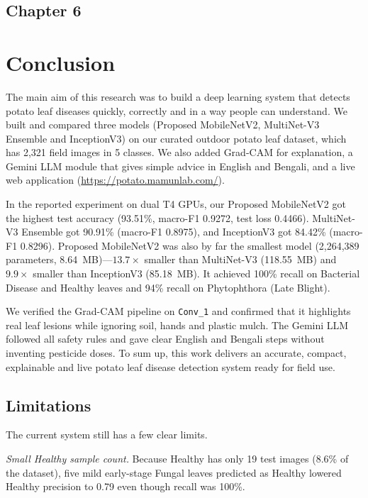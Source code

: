 \begin{center}
    \section*{\fontsize{20}{20}\selectfont Chapter 6}
\end{center}
\vspace{10mm}

\section{Conclusion}

The main aim of this research was to build a deep learning system that detects potato leaf diseases quickly, correctly and in a way people can understand. We built and compared three models (Proposed MobileNetV2, MultiNet-V3 Ensemble and InceptionV3) on our curated outdoor potato leaf dataset, which has 2,321 field images in 5 classes. We also added Grad-CAM for explanation, a Gemini LLM module that gives simple advice in English and Bengali, and a live web application (\url{https://potato.mamunlab.com/}).

In the reported experiment on dual T4 GPUs, our Proposed MobileNetV2 got the highest test accuracy (93.51\%, macro-F1 0.9272, test loss 0.4466). MultiNet-V3 Ensemble got 90.91\% (macro-F1 0.8975), and InceptionV3 got 84.42\% (macro-F1 0.8296). Proposed MobileNetV2 was also by far the smallest model (2,264,389 parameters, 8.64~MB)---$13.7\times$ smaller than MultiNet-V3 (118.55~MB) and $9.9\times$ smaller than InceptionV3 (85.18~MB). It achieved 100\% recall on Bacterial Disease and Healthy leaves and 94\% recall on Phytophthora (Late Blight).

We verified the Grad-CAM pipeline on \texttt{Conv\_1} and confirmed that it highlights real leaf lesions while ignoring soil, hands and plastic mulch. The Gemini LLM followed all safety rules and gave clear English and Bengali steps without inventing pesticide doses. To sum up, this work delivers an accurate, compact, explainable and live potato leaf disease detection system ready for field use.

\subsection{Limitations}
The current system still has a few clear limits.

\textit{Small Healthy sample count.} Because Healthy has only 19 test images (8.6\% of the dataset), five mild early-stage Fungal leaves predicted as Healthy lowered Healthy precision to 0.79 even though recall was 100\%.

